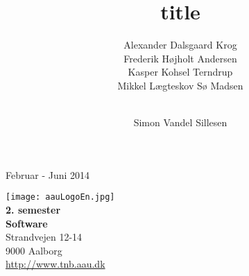 \author{Alexander Dalsgaard Krog \andnext\\
    Frederik Højholt Andersen \andnext\\
    Kasper Kohsel Terndrup \andnext\\
    Mikkel Lægteskov Sø Madsen \and\\
    Simon Vandel Sillesen}

\title{title}

\begin{titlingpage}

\vspace*{2cm}
     \makebox[\linewidth]{
     }
     \vfill
     \centerline{Februar - Juni 2014}
     \clearpage

\begin{minipage}[t]{0.5\textwidth}
\begin{flushright}
	\texttt{[image: aauLogoEn.jpg]}\\
		\small \textbf{2. semester} \\
		\small \textbf{Software}\\
		\small Strandvejen 12-14 \\
		\small 9000 Aalborg \\
		\small \url{http://www.tnb.aau.dk}\\
		\bigskip
		\fbox{
  		\parbox{\linewidth}{
     		{
     		}
     	}}
\end{flushright}
\end{minipage}
\end{titlingpage}